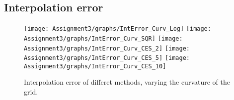\documentclass[]{article}
\begin{document}
\hypertarget{interpolation-error}{%
\subsection{Interpolation error}\label{interpolation-error}}

\begin{figure}

{\centering \texttt{[image: Assignment3/graphs/IntError\_Curv\_Log]} \texttt{[image: Assignment3/graphs/IntError\_Curv\_SQR]} \texttt{[image: Assignment3/graphs/IntError\_Curv\_CES\_2]} \texttt{[image: Assignment3/graphs/IntError\_Curv\_CES\_5]} \texttt{[image: Assignment3/graphs/IntError\_Curv\_CES\_10]} 

}

\caption{Interpolation error of differet methods, varying the curvature of the grid.}\label{fig:unnamed-chunk-13}
\end{figure}
\end{document}
